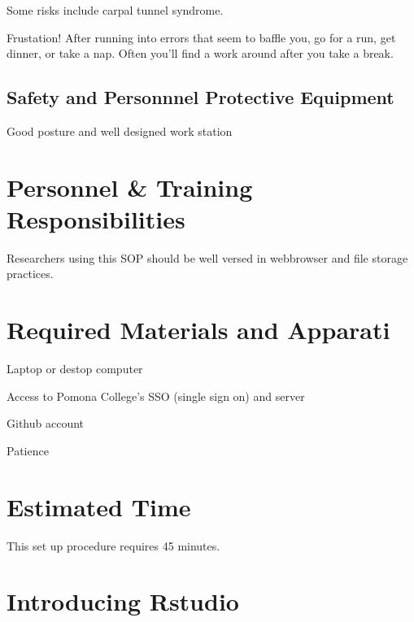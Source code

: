 \documentclass[12pt]{../SOP4_alpha}\usepackage[]{graphicx}\usepackage[]{xcolor}
\begin{document}
\NP Some risks include carpal tunnel syndrome.

\NP Frustation!  After running into errors that seem to baffle you, go for a run, get dinner, or take a nap. Often you'll find a work around after you take a break. 


\subsection*{Safety and Personnnel Protective Equipment}

\NP Good posture and well designed work station

\section{Personnel \& Training Responsibilities}

\NP Researchers using this SOP should be well versed in webbrowser and file storage practices. 


\section{Required Materials and Apparati}

\NP Laptop or destop computer

\NP Access to Pomona College's SSO (single sign on) and server

\NP Github account

\NP Patience


\section{Estimated Time}

\NP This set up procedure requires 45 minutes.


\section{Introducing Rstudio}
\end{document}
